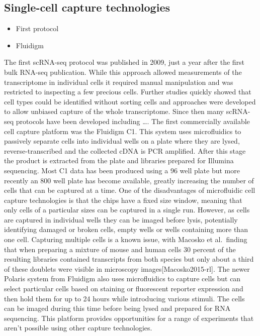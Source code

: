 \documentclass[11pt,a4paper,titlepage,twoside,openright]{style/unimelbthesis}
\theoremstyle{definition}
\theoremstyle{definition}
\theoremstyle{definition}
\theoremstyle{remark}
\begin{document}
\begin{mainmatter}
\hypertarget{single-cell-capture-technologies}{%
\section{Single-cell capture technologies}\label{single-cell-capture-technologies}}

\begin{itemize}
\tightlist
\item
  First protocol
\item
  Fluidigm
\end{itemize}

The first scRNA-seq protocol was published in 2009, just a year after the first bulk RNA-seq publication. While this approach allowed measurements of the transcriptome in individual cells it required manual manipulation and was restricted to inspecting a few precious cells. Further studies quickly showed that cell types could be identified without sorting cells and approaches were developed to allow unbiased capture of the whole transcriptome. Since then many scRNA-seq protocols have been developed including \ldots{}. The first commercially available cell capture platform was the Fluidigm C1. This system uses microfluidics to passively separate cells into individual wells on a plate where they are lysed, reverse-transcribed and the collected cDNA is PCR amplified. After this stage the product is extracted from the plate and libraries prepared for Illumina sequencing. Most C1 data has been produced using a 96 well plate but more recently an 800 well plate has become available, greatly increasing the number of cells that can be captured at a time. One of the disadvantages of microfluidic cell capture technologies is that the chips have a fixed size window, meaning that only cells of a particular sizes can be captured in a single run. However, as cells are captured in individual wells they can be imaged before lysis, potentially identifying damaged or broken cells, empty wells or wells containing more than one cell. Capturing multiple cells is a known issue, with Macosko et al.~finding that when preparing a mixture of mouse and human cells 30 percent of the resulting libraries contained transcripts from both species but only about a third of these doublets were visible in microscopy images{[}Macosko2015-rl{]}. The newer Polaris system from Fluidigm also uses microfluidics to capture cells but can select particular cells based on staining or fluorescent reporter expression and then hold them for up to 24 hours while introducing various stimuli. The cells can be imaged during this time before being lysed and prepared for RNA sequencing. This platform provides opportunities for a range of experiments that aren't possible using other capture technologies.


\end{mainmatter}
\end{document}
